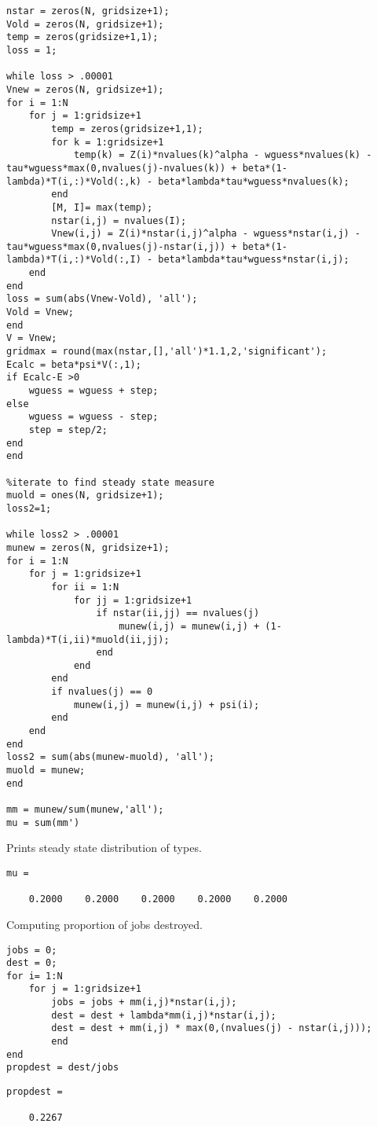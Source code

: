 \documentclass[12pt]{article}
\begin{document}
\begin{onehalfspace}
\begin{enumerate}[1.]
\begin{enumerate}
\begin{lstlisting}
nstar = zeros(N, gridsize+1);
Vold = zeros(N, gridsize+1);
temp = zeros(gridsize+1,1);
loss = 1;

while loss > .00001
Vnew = zeros(N, gridsize+1);
for i = 1:N
    for j = 1:gridsize+1
        temp = zeros(gridsize+1,1);
        for k = 1:gridsize+1
            temp(k) = Z(i)*nvalues(k)^alpha - wguess*nvalues(k) - tau*wguess*max(0,nvalues(j)-nvalues(k)) + beta*(1-lambda)*T(i,:)*Vold(:,k) - beta*lambda*tau*wguess*nvalues(k);
        end
        [M, I]= max(temp);
        nstar(i,j) = nvalues(I);
        Vnew(i,j) = Z(i)*nstar(i,j)^alpha - wguess*nstar(i,j) - tau*wguess*max(0,nvalues(j)-nstar(i,j)) + beta*(1-lambda)*T(i,:)*Vold(:,I) - beta*lambda*tau*wguess*nstar(i,j);
    end
end
loss = sum(abs(Vnew-Vold), 'all');
Vold = Vnew;
end
V = Vnew;
gridmax = round(max(nstar,[],'all')*1.1,2,'significant');
Ecalc = beta*psi*V(:,1);
if Ecalc-E >0
    wguess = wguess + step;
else
    wguess = wguess - step;
    step = step/2;
end
end

%iterate to find steady state measure
muold = ones(N, gridsize+1);
loss2=1;

while loss2 > .00001
munew = zeros(N, gridsize+1);
for i = 1:N
    for j = 1:gridsize+1
        for ii = 1:N
            for jj = 1:gridsize+1
                if nstar(ii,jj) == nvalues(j)
                    munew(i,j) = munew(i,j) + (1-lambda)*T(i,ii)*muold(ii,jj);
                end
            end
        end
        if nvalues(j) == 0
            munew(i,j) = munew(i,j) + psi(i);
        end
    end
end
loss2 = sum(abs(munew-muold), 'all');
muold = munew;
end

mm = munew/sum(munew,'all');
mu = sum(mm')
\end{lstlisting}
Prints steady state distribution of types.
\begin{lstlisting}
mu =

    0.2000    0.2000    0.2000    0.2000    0.2000
\end{lstlisting}
Computing proportion of jobs destroyed.
\begin{lstlisting}
jobs = 0;
dest = 0;
for i= 1:N
    for j = 1:gridsize+1
        jobs = jobs + mm(i,j)*nstar(i,j);
        dest = dest + lambda*mm(i,j)*nstar(i,j);
        dest = dest + mm(i,j) * max(0,(nvalues(j) - nstar(i,j)));
        end
end
propdest = dest/jobs
\end{lstlisting}
\begin{lstlisting}
propdest =

    0.2267 
\end{lstlisting}
    \end{enumerate}
    

\end{enumerate}
\end{onehalfspace}
\end{document}
